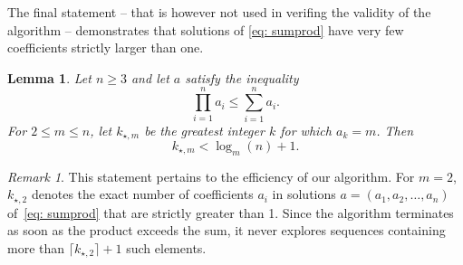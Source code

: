 \documentclass[10pt]{article}
\newtheorem{lemma}{Lemma}
\theoremstyle{definition}
\theoremstyle{remark}
\newtheorem{remark}{Remark}
\numberwithin{equation}{section}
\begin{document}
The final statement -- that is however not used in verifing the validity of the algorithm -- demonstrates that solutions of \eqref{eq: sumprod} have very few coefficients strictly larger than one. 
\begin{lemma}\label{lem: log length}
Let $n\geq 3$ and let $a$ satisfy the inequality
\begin{equation}\label{ineq: sumprod}
\prod_{i=1}^n a_i\leq\sum_{i=1}^n a_i.
\end{equation}
For $2\leq m\leq n$, let $k_{\star,m}$ be the greatest integer $k$ for which $a_k=m$. Then
\begin{equation}\label{eq: log}
k_{\star,m}< \log_m(n)+1.
\end{equation}
\end{lemma}
\begin{remark}
This statement pertains to the efficiency of our algorithm. For \( m = 2 \), \( k_{\star,2} \) denotes the exact number of coefficients \( a_i \) in solutions \( a = (a_1, a_2, \dots, a_n) \) of~\eqref{eq: sumprod} that are strictly greater than 1. Since the algorithm terminates as soon as the product exceeds the sum, it never explores sequences containing more than \( \lceil k_{\star,2} \rceil + 1 \) such elements.
\end{remark}
\end{document}
